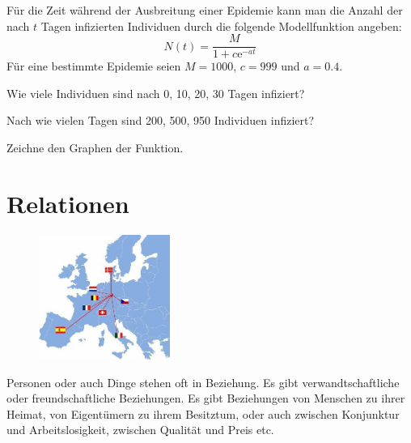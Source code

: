 \documentclass[%
11pt,%
twoside,%
titlepage,%
german,%
headsepline%
]{scrartcl}
\begin{document}
\begin{ueb}[Epidemie]
Für die Zeit während der Ausbreitung einer Epidemie kann man die Anzahl der nach $t$ Tagen infizierten Individuen durch die folgende Modellfunktion angeben:
$$N(t)=\frac{M}{1+c\mathrm{e}^{-at}}$$
Für eine bestimmte Epidemie seien $M= 1000$, $c=999$
und $a=0.4$.
\begin{enumeratea}
\item Wie viele Individuen sind nach 0, 10, 20, 30 Tagen infiziert?
\item Nach wie vielen Tagen sind 200, 500, 950 Individuen infiziert?
\item Zeichne den Graphen der Funktion.
\end{enumeratea}
\end{ueb}


\cleardoublepage

\appendix

\section{Relationen}
\begin{figure}
  \begin{center}
    \includegraphics[width=0.382\textwidth]{pictures/relationen}
  \end{center}
\end{figure}
Personen oder auch Dinge stehen oft in Beziehung. Es gibt verwandtschaftliche oder freundschaftliche Beziehungen. Es gibt Beziehungen von Menschen zu ihrer Heimat, von Eigent\"umern zu ihrem Besitztum, oder auch zwischen Konjunktur und Arbeitslosigkeit, zwischen Qualit\"at und Preis etc.
\end{document}
